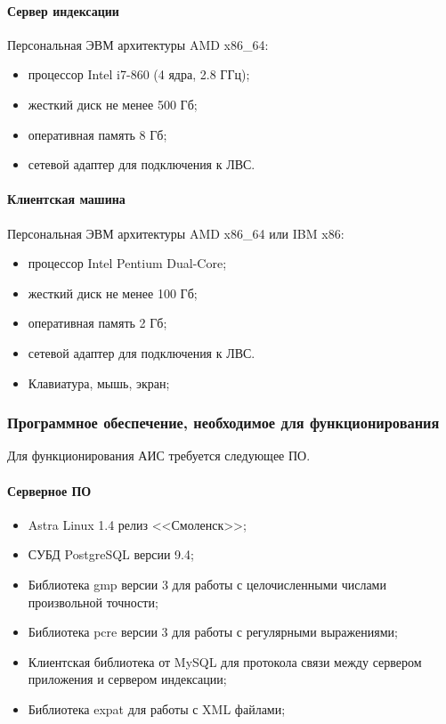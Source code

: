\paragraph*{Сервер индексации} \hfill

Персональная ЭВМ архитектуры AMD x86\_64:
\begin{itemize}
\item процессор Intel i7-860 (4 ядра, 2.8 ГГц);
\item жесткий диск не менее 500 Гб;
\item оперативная память 8 Гб;
\item сетевой адаптер для подключения к ЛВС.
\end{itemize}

\paragraph*{Клиентская машина} \hfill

Персональная ЭВМ архитектуры AMD x86\_64 или IBM x86:
\begin{itemize}
\item процессор Intel Pentium Dual-Core;
\item жесткий диск не менее 100 Гб;
\item оперативная память 2 Гб;
\item сетевой адаптер для подключения к ЛВС.
\item Клавиатура, мышь, экран;
\end{itemize}


\subsubsection{Программное обеспечение, необходимое для функционирования}

Для функционирования АИС требуется следующее ПО.

  \paragraph*{Серверное ПО} \hfill

  \begin{itemize}
  \item Astra Linux 1.4 релиз <<Смоленск>>;
  \item СУБД PostgreSQL версии 9.4;
  \item Библиотека gmp версии 3 для работы с целочисленными числами произвольной точности;
  \item Библиотека pcre версии 3 для работы с регулярными выражениями;
  \item Клиентская библиотека от MySQL для протокола связи между сервером приложения и сервером индексации;
  \item Библиотека expat для работы с XML файлами;
  \end{itemize}

